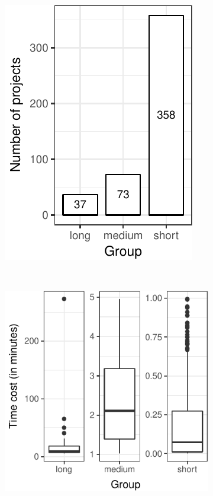 \begin{figure}[ht]
    \centering
    \begin{subfigure}{0.182\textwidth}
        \centering
        \includegraphics[width=\textwidth]{results/barplot-timecost.pdf}
        \caption{\label{fig:rq1-barplot}}
    \end{subfigure}%
    ~
    \begin{subfigure}{0.25\textwidth}
        \centering
        \includegraphics[width=\textwidth]{results/boxplot-timecost.pdf}

\end{subfigure}
\end{figure}
